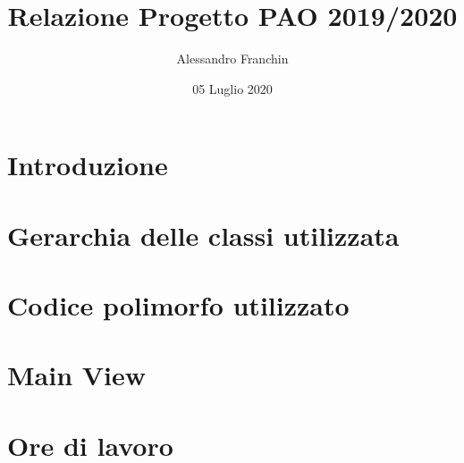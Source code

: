 \documentclass[12pt, letterpaper]{article}
\title{Relazione Progetto PAO 2019/2020}
\author{Alessandro Franchin}
\date{05 Luglio 2020}
\begin{document}
\begin{titlepage}
    \maketitle
\end{titlepage}
\clearpage
\tableofcontents
\newpage


\section{Introduzione}
\label{sec:introduzione}



\newpage
\section{Gerarchia delle classi utilizzata}
\label{sec:gerarchia}


\newpage
\section{Codice polimorfo utilizzato}
\label{sec:polimorfo}


\newpage
\section{Main View}
\label{sec:introduzione}


\newpage
\section{Ore di lavoro}
\label{sec:ore}

\end{document}
